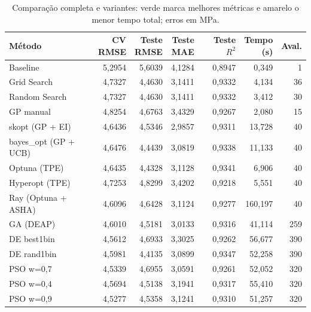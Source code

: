 \documentclass[12pt,a4paper]{article}
\begin{document}
\begin{table}[H]
\centering
\caption{Comparação completa e variantes: verde marca melhores métricas e amarelo o menor tempo total; erros em MPa.}
\footnotesize
\setlength{\tabcolsep}{4.5pt}
\renewcommand{\arraystretch}{1.16}
\begin{adjustbox}{max width=\linewidth}
\begin{tabular}{@{}lrrrrrr@{}}
\toprule
Método & \shortstack[r]{CV\\RMSE} & \shortstack[r]{Teste\\RMSE} & \shortstack[r]{Teste\\MAE} & \shortstack[r]{Teste\\$R^2$} & \shortstack[r]{Tempo\\(s)} & Aval. \\
\midrule
Baseline & 5{,}2954 & 5{,}6039 & 4{,}1284 & 0{,}8947 & \cellcolor{timeyellow}0{,}349 & 1 \\
Grid Search & 4{,}7327 & 4{,}4630 & 3{,}1411 & 0{,}9332 & 4{,}134 & 36 \\
Random Search & 4{,}7327 & 4{,}4630 & 3{,}1411 & 0{,}9332 & 3{,}412 & 30 \\
GP manual & 4{,}8254 & 4{,}6763 & 3{,}4329 & 0{,}9267 & 2{,}080 & 15 \\
skopt (GP + EI) & 4{,}6436 & 4{,}5346 & \cellcolor{bestgreen}2{,}9857 & 0{,}9311 & 13{,}728 & 40 \\
\addlinespace[3pt]
bayes\_opt (GP + UCB) & 4{,}6476 & 4{,}4439 & 3{,}0819 & 0{,}9338 & 11{,}133 & 40 \\
Optuna (TPE) & 4{,}6435 & 4{,}4328 & 3{,}1128 & 0{,}9341 & 6{,}906 & 40 \\
Hyperopt (TPE) & 4{,}7253 & 4{,}8299 & 3{,}4202 & 0{,}9218 & 5{,}551 & 40 \\
Ray (Optuna + ASHA) & 4{,}6096 & 4{,}6428 & 3{,}1124 & 0{,}9277 & 160{,}197 & 40 \\
GA (DEAP) & 4{,}6010 & 4{,}5181 & 3{,}0133 & 0{,}9316 & 41{,}114 & 259 \\
\addlinespace[3pt]
DE best1bin & 4{,}5612 & 4{,}6933 & 3{,}3025 & 0{,}9262 & 56{,}677 & 390 \\
DE rand1bin & 4{,}5981 & \cellcolor{bestgreen}4{,}4135 & 3{,}0899 & \cellcolor{bestgreen}0{,}9347 & 52{,}258 & 390 \\
PSO w=0,7 & 4{,}5339 & 4{,}6955 & 3{,}0591 & 0{,}9261 & 52{,}052 & 320 \\
PSO w=0,4 & 4{,}5694 & 4{,}5138 & 3{,}1941 & 0{,}9317 & 55{,}410 & 320 \\
PSO w=0,9 & \cellcolor{bestgreen}4{,}5277 & 4{,}5358 & 3{,}1241 & 0{,}9310 & 51{,}257 & 320 \\
\bottomrule
\end{tabular}
\end{adjustbox}
\end{table}
\end{document}
